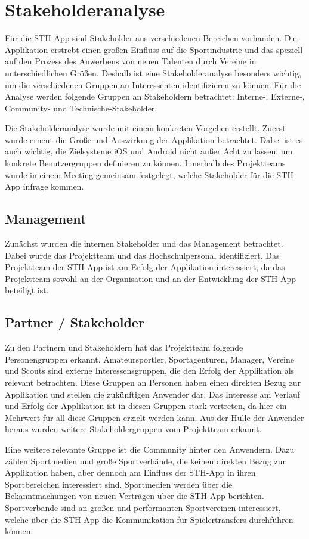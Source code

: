 \chapter{Stakeholderanalyse}
Für die STH App sind Stakeholder aus verschiedenen Bereichen vorhanden. Die Applikation erstrebt einen großen Einfluss auf die Sportindustrie und das speziell auf den Prozess des Anwerbens von neuen Talenten durch Vereine in unterschiedlichen Größen. Deshalb ist eine Stakeholderanalyse besonders wichtig, um die verschiedenen Gruppen an Interessenten identifizieren zu können. Für die Analyse werden folgende Gruppen an Stakeholdern betrachtet: Interne-, Externe-, Community- und Technische-Stakeholder. 

\noindent
Die Stakeholderanalyse wurde mit einem konkreten Vorgehen erstellt. Zuerst wurde erneut die Größe und Auswirkung der Applikation betrachtet.
Dabei ist es auch wichtig, die Zielsysteme iOS und Android nicht außer Acht zu lassen, um konkrete Benutzergruppen definieren zu können. Innerhalb des Projektteams wurde in einem Meeting gemeinsam festgelegt, welche Stakeholder für die STH-App infrage kommen.

\section{Management}
Zunächst wurden die internen Stakeholder und das Management betrachtet.
Dabei wurde das Projektteam und das Hochschulpersonal identifiziert. Das Projektteam der STH-App ist am Erfolg der Applikation interessiert, da das Projektteam sowohl an der Organisation und an der Entwicklung der STH-App beteiligt ist.

\section{Partner / Stakeholder}
Zu den Partnern und Stakeholdern hat das Projektteam folgende Personengruppen erkannt. Amateursportler, Sportagenturen, Manager, Vereine und Scouts sind externe Interessensgruppen, die den Erfolg der Applikation als relevant betrachten. Diese Gruppen an Personen haben einen direkten Bezug zur Applikation und stellen die zukünftigen Anwender dar. Das Interesse am Verlauf und Erfolg der Applikation ist in diesen Gruppen stark vertreten, da hier ein Mehrwert für all diese Gruppen erzielt werden kann. Aus der Hülle der Anwender heraus wurden weitere Stakeholdergruppen vom Projektteam erkannt.

\noindent
Eine weitere relevante Gruppe ist die Community hinter den Anwendern. Dazu zählen Sportmedien und große Sportverbände, die keinen direkten Bezug zur Applikation haben, aber dennoch am Einfluss der STH-App in ihren Sportbereichen interessiert sind. Sportmedien werden über die Bekanntmachungen von neuen Verträgen über die STH-App berichten. Sportverbände sind an großen und performanten Sportvereinen interessiert, welche über die STH-App die Kommunikation für Spielertransfers durchführen können.


